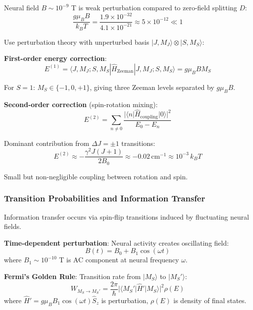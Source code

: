 \documentclass[11pt,onecolumn]{article}
\begin{document}
Neural field $B \sim 10^{-9}$ T is weak perturbation compared to zero-field splitting $D$:
\begin{equation}
\frac{g\mu_B B}{k_B T} = \frac{1.9 \times 10^{-32}}{4.1 \times 10^{-21}} \approx 5 \times 10^{-12} \ll 1
\end{equation}

Use perturbation theory with unperturbed basis $|J, M_J\rangle \otimes |S, M_S\rangle$:

\textbf{First-order energy correction}:
\begin{equation}
E^{(1)} = \langle J, M_J; S, M_S | \hat{H}_{\text{Zeeman}} | J, M_J; S, M_S \rangle = g\mu_B B M_S
\end{equation}

For $S=1$: $M_S \in \{-1, 0, +1\}$, giving three Zeeman levels separated by $g\mu_B B$.

\textbf{Second-order correction} (spin-rotation mixing):
\begin{equation}
E^{(2)} = \sum_{n \neq 0} \frac{|\langle n | \hat{H}_{\text{coupling}} | 0 \rangle|^2}{E_0 - E_n}
\end{equation}

Dominant contribution from $\Delta J = \pm 1$ transitions:
\begin{equation}
E^{(2)} \approx -\frac{\gamma^2 J(J+1)}{2B_0} \approx -0.02\,\text{cm}^{-1} \approx 10^{-3}\,k_B T
\end{equation}

Small but non-negligible coupling between rotation and spin.

\subsubsection{Transition Probabilities and Information Transfer}

Information transfer occurs via spin-flip transitions induced by fluctuating neural fields.

\textbf{Time-dependent perturbation}:
Neural activity creates oscillating field:
\begin{equation}
B(t) = B_0 + B_1 \cos(\omega t)
\end{equation}
where $B_1 \sim 10^{-10}$ T is AC component at neural frequency $\omega$.

\textbf{Fermi's Golden Rule}:
Transition rate from $|M_S\rangle$ to $|M_S'\rangle$:
\begin{equation}
W_{M_S \to M_S'} = \frac{2\pi}{\hbar}|\langle M_S' | \hat{H}'| M_S\rangle|^2 \rho(E)
\end{equation}
where $\hat{H}' = g\mu_B B_1 \cos(\omega t) \hat{S}_z$ is perturbation, $\rho(E)$ is density of final states.
\end{document}
